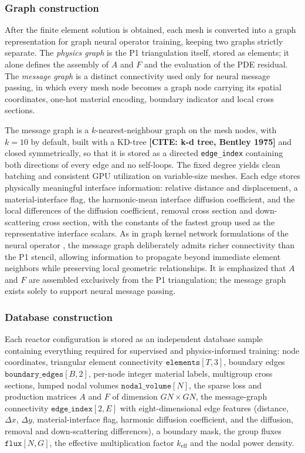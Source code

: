 \documentclass[preprint,12pt]{elsarticle}
\newcommand{\keff}{k_{\mathrm{eff}}}
\newcommand{\todocite}[1]{\textbf{[CITE: #1]}}
\begin{document}
\subsubsection{Graph construction}
\label{sec:graph}

After the finite element solution is obtained, each mesh is converted into a
graph representation for graph neural operator training, keeping two graphs
strictly separate. The \emph{physics graph} is the P1 triangulation itself,
stored as elements; it alone defines the assembly of $A$ and $F$ and the
evaluation of the PDE residual. The \emph{message graph} is a distinct
connectivity used only for neural message passing, in which every mesh node
becomes a graph node carrying its spatial coordinates, one-hot material
encoding, boundary indicator and local cross sections.

The message graph is a $k$-nearest-neighbour graph on the mesh nodes, with
$k=10$ by default, built with a KD-tree \todocite{k-d tree, Bentley 1975} and
closed symmetrically, so that it is
stored as a directed \texttt{edge\_index} containing both directions of every
edge and no self-loops. The fixed degree yields clean batching and consistent
GPU utilization on variable-size meshes. Each edge stores physically meaningful interface information:
relative distance and displacement, a material-interface flag, the
harmonic-mean interface diffusion coefficient, and the local differences of the
diffusion coefficient, removal cross section and down-scattering cross section,
with the constants of the fastest group used as the representative interface
scalars. As in graph kernel network formulations of the neural operator
\citep{li2020}, the message graph deliberately admits richer connectivity than
the P1 stencil, allowing information to propagate beyond immediate element neighbors
while preserving local geometric relationships. It is emphasized that $A$ and
$F$ are assembled exclusively from the P1 triangulation; the message graph
exists solely to support neural message passing.

\subsubsection{Database construction}
\label{sec:database}

Each reactor configuration is stored as an independent database sample
containing everything required for supervised and physics-informed training:
node coordinates, triangular element connectivity
$\texttt{elements}[T,3]$, boundary edges $\texttt{boundary\_edges}[B,2]$,
per-node integer material labels, multigroup cross sections, lumped nodal
volumes $\texttt{nodal\_volume}[N]$, the sparse loss and production matrices
$A$ and $F$ of dimension $GN \times GN$, the message-graph connectivity
$\texttt{edge\_index}[2,E]$ with eight-dimensional edge features (distance,
$\Delta x$, $\Delta y$, material-interface flag, harmonic diffusion
coefficient, and the diffusion, removal and down-scattering differences), a
boundary mask, the group fluxes $\texttt{flux}[N,G]$, the effective
multiplication factor $\keff$ and the nodal power density.
\end{document}
